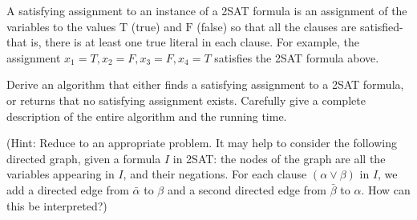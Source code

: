 \documentclass[11pt]{article}
\begin{document}
\begin{enumerate}
A satisfying assignment to an instance of a 2SAT formula is an assignment of the variables to the values $\mathrm{T}$ (true) and $\mathrm{F}$ (false) so that all the clauses are satisfied- that is, there is at least one true literal in each clause. For example, the assignment $x_1=T, x_2=F, x_3=F, x_4=T$ satisfies the 2SAT formula above.

Derive an algorithm that either finds a satisfying assignment to a 2SAT formula, or returns that no satisfying assignment exists. Carefully give a complete description of the entire algorithm and the running time.

(Hint: Reduce to an appropriate problem. It may help to consider the following directed graph, given a formula $I$ in 2SAT: the nodes of the graph are all the variables appearing in $I$, and their negations. For each clause $(\alpha \vee \beta)$ in $I$, we add a directed edge from $\bar{\alpha}$ to $\beta$ and a second directed edge from $\bar{\beta}$ to $\alpha$. How can this be interpreted?)


\end{enumerate}
\end{document}
